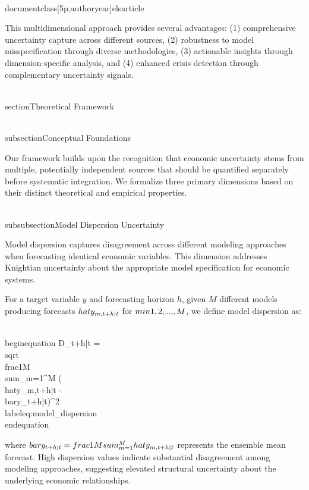 \\documentclass[5p,authoryear]{elsarticle}
\begin{document}
This multidimensional approach provides several advantages: (1) comprehensive uncertainty capture across different sources, (2) robustness to model misspecification through diverse methodologies, (3) actionable insights through dimension-specific analysis, and (4) enhanced crisis detection through complementary uncertainty signals.

\\section{Theoretical Framework}

\\subsection{Conceptual Foundations}

Our framework builds upon the recognition that economic uncertainty stems from multiple, potentially independent sources that should be quantified separately before systematic integration. We formalize three primary dimensions based on their distinct theoretical and empirical properties.

\\subsubsection{Model Dispersion Uncertainty}

Model dispersion captures disagreement across different modeling approaches when forecasting identical economic variables. This dimension addresses Knightian uncertainty about the appropriate model specification for economic systems.

For a target variable $y$ and forecasting horizon $h$, given $M$ different models producing forecasts $\\hat{y}_{m,t+h|t}$ for $m \\in \\{1,2,...,M\\}$, we define model dispersion as:

\\begin{equation}
D_{t+h|t} = \\sqrt{\\frac{1}{M} \\sum_{m=1}^{M} (\\hat{y}_{m,t+h|t} - \\bar{y}_{t+h|t})^2}
\\label{eq:model_dispersion}
\\end{equation}

where $\\bar{y}_{t+h|t} = \\frac{1}{M} \\sum_{m=1}^{M} \\hat{y}_{m,t+h|t}$ represents the ensemble mean forecast. High dispersion values indicate substantial disagreement among modeling approaches, suggesting elevated structural uncertainty about the underlying economic relationships.
\end{document}
